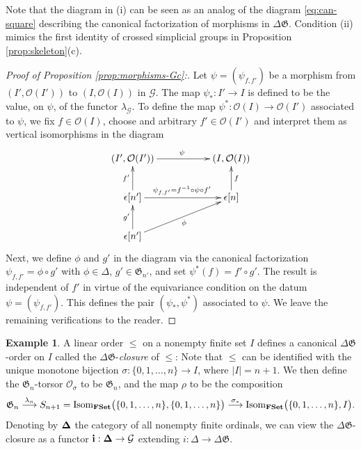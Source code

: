 \documentclass[english,11pt,leqno]{article}
\def\Gen{\mathfrak{G}}
\def\Gc{\mathcal{G}}
\def\Oc{\mathcal{O}}
\def\on{\operatorname}
\def\lra{\longrightarrow}
\def\Isom{\on{Isom}}
\def\DG{ {\Delta \Gen}}
\def\FSet{{\bf FSet}}
\theoremstyle{definition}
\newtheorem{exa}[thm]{Example}
\theoremstyle{remark}
\numberwithin{equation}{section}
\begin{document}
Note that the diagram in (i) can be seen as an analog of the diagram
\eqref{eq:can-square} describing the canonical factorization of morphisms in $\DG$.
Condition (ii) mimics the first identity of crossed simplicial groups in
Proposition \ref{prop:skeleton}(c). 

\begin{proof}[Proof of Proposition \ref{prop:morphisms-Gc}:]
Let $\psi=(\psi_{f,f'})$ be a morphism from $(I', \Oc(I'))$
to $(I, \Oc(I))$ in $\Gc$. The map $\psi_*: I'\to I$ is defined to be the value, on $\psi$,
of the functor $\lambda_{\Gc}$. To define the map $\psi^*: \Oc(I)\to\Oc(I')$ associated to $\psi$,
we fix $f\in\Oc(I)$, choose and arbitrary $f'\in\Oc(I')$ and interpret them as vertical
isomorphisms in the diagram
\[
\xymatrix{
(I', \Oc(I')) \ar[rr]^\psi && (I, \Oc(I))
\\
\epsilon[n']
\ar[u]^{f'} 
 \ar[rr]^{\psi_{f, f'} = f^{-1}\circ\psi\circ f' }&& \epsilon[n]
 \ar[u]_f
 \\\epsilon[n']\ar[u]^{g'} 
 \ar[urr]_\phi
}
\]
Next, we define $\phi$ and $g'$ in the diagram via the canonical factorization
$\psi_{f, f'} = \phi\circ g'$ with $\phi\in\Delta$, $g'\in\Gen_{n'}$, and set $\psi^*(f)=f'\circ g'$. The result is independent
of $f'$ in virtue of the equivariance condition on the datum $\psi=(\psi_{f, f'})$. 
This defines the pair $(\psi_*, \psi^*)$ associated to $\psi$. We leave the remaining verifications
to the reader. 
\end{proof}

\begin{exa}\label{ex:DG-closure} A linear order $\leq$ on a nonempty finite set $I$ defines a
	canonical $\DG$-order on $I$ called the $\DG$-{\em closure} of $\leq$: Note
	that $\leq$ can be identified with the unique monotone bijection $\sigma:
	\{0,1,\dots, n\}\to I$, where $|I|= n+1$. We then define the $\Gen_n$-torsor $\Oc_{\sigma}$ to
	be $\Gen_n$, and the map $\rho$ to be the composition
	\[
	\Gen_n\buildrel\lambda_n\over\lra S_{n+1}= \Isom_{\FSet}\bigl(
	\{0,1,\dots, n\}, \{0,1,\dots, n\}\bigr)\buildrel\sigma_*\over\lra 
	 \Isom_{\FSet}\bigl(
	\{0,1,\dots, n\},  I\bigr). 
	\]
	Denoting by ${\bf\Delta}$ the category of all nonempty finite ordinals, we can
	view the $\DG$-closure as a functor ${\bf i}: {\bf\Delta} \to\Gc$ extending
	$i:\Delta \to \DG$. 
\end{exa}
\end{document}
